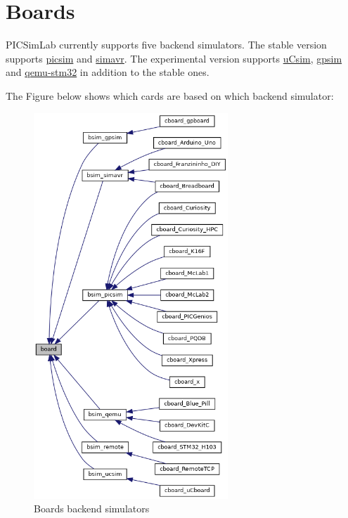 \chapter{Boards} \hypertarget{def:boards}{}

PICSimLab currently supports five backend simulators. The stable version supports 
\href{https://github.com/lcgamboa/picsim}{picsim} and \href{https://github.com/buserror/simavr}{simavr}. 
The experimental version supports \href{http://mazsola.iit.uni-miskolc.hu/\%7edrdani/embedded/ucsim/}{uCsim}, 
\href{http://gpsim.sourceforge.net/}{gpsim} and \href{http://beckus.github.io/qemu_stm32/}{qemu-stm32} in 
addition to the stable ones.

The Figure below shows which cards are based on which backend simulator:

\begin{figure}[H] 
\center
\includegraphics[width=0.65\textwidth]{img/boards.png} 
\caption{Boards backend simulators}
\end{figure} 

